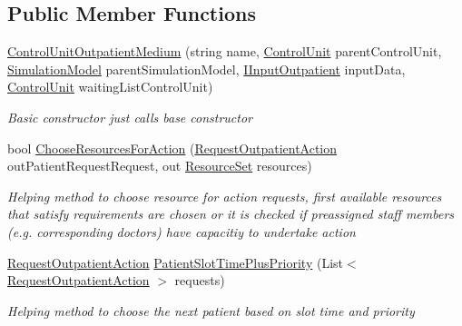 \subsection*{Public Member Functions}
\begin{DoxyCompactItemize}
\item 
\hyperlink{class_sample_hospital_model_1_1_outpatient_1_1_control_unit_outpatient_medium_aab84aa98328da38934ba3cf464aadc15}{Control\+Unit\+Outpatient\+Medium} (string name, \hyperlink{class_simulation_core_1_1_h_c_c_m_elements_1_1_control_unit}{Control\+Unit} parent\+Control\+Unit, \hyperlink{class_simulation_core_1_1_simulation_classes_1_1_simulation_model}{Simulation\+Model} parent\+Simulation\+Model, \hyperlink{interface_general_health_care_elements_1_1_department_models_1_1_outpatient_1_1_i_input_outpatient}{I\+Input\+Outpatient} input\+Data, \hyperlink{class_simulation_core_1_1_h_c_c_m_elements_1_1_control_unit}{Control\+Unit} waiting\+List\+Control\+Unit)
\begin{DoxyCompactList}\small\item\em Basic constructor just calls base constructor \end{DoxyCompactList}\item 
bool \hyperlink{class_sample_hospital_model_1_1_outpatient_1_1_control_unit_outpatient_medium_ac04262c2b05d081a447020462938e045}{Choose\+Resources\+For\+Action} (\hyperlink{class_general_health_care_elements_1_1_department_models_1_1_outpatient_1_1_request_outpatient_action}{Request\+Outpatient\+Action} out\+Patient\+Request\+Request, out \hyperlink{class_general_health_care_elements_1_1_resource_handling_1_1_resource_set}{Resource\+Set} resources)
\begin{DoxyCompactList}\small\item\em Helping method to choose resource for action requests, first available resources that satisfy requirements are chosen or it is checked if preassigned staff members (e.\+g. corresponding doctors) have capacitiy to undertake action \end{DoxyCompactList}\item 
\hyperlink{class_general_health_care_elements_1_1_department_models_1_1_outpatient_1_1_request_outpatient_action}{Request\+Outpatient\+Action} \hyperlink{class_sample_hospital_model_1_1_outpatient_1_1_control_unit_outpatient_medium_a1995916a3078a866a70d50bec984c029}{Patient\+Slot\+Time\+Plus\+Priority} (List$<$ \hyperlink{class_general_health_care_elements_1_1_department_models_1_1_outpatient_1_1_request_outpatient_action}{Request\+Outpatient\+Action} $>$ requests)
\begin{DoxyCompactList}\small\item\em Helping method to choose the next patient based on slot time and priority \end{DoxyCompactList}\end{DoxyCompactItemize}
